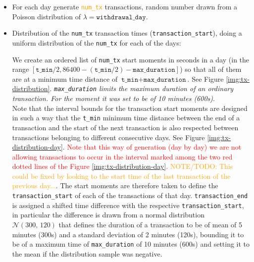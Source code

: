 \documentclass{article}
\begin{document}
\begin{itemize}
    \item For each day generate \textcolor{orange}{\texttt{num\_tx}} transactions, random 
    number drawn from a Poisson distribution of $\lambda = \texttt{withdrawal\_day}$.

    \item Distribution of the \texttt{num\_tx} transaction times 
    (\texttt{transaction\_start}), doing a uniform distribution of the \texttt{num\_tx}
    for each of the days: 
    
    We create an ordered list of  \texttt{num\_tx} start moments in seconds in a day 
    (in the range $[\texttt{t\_min}/2, 86400-(\texttt{t\_min}/2)-\texttt{max\_duration}]$) so that all of them are at a minimum time distance of $\texttt{t\_min} + \texttt{max\_duration}$. See Figure \ref{img:tx-distribution}.
    \textit{\texttt{max\_duration} limits the maximum duration of an ordinary transaction. 
    For the moment it was set to be of 10 minutes (600s)}.\\
    Note that the interval bounds for the transaction start moments are designed in such 
    a way that the \texttt{t\_min} minimum time distance between the end of a transaction 
    and the start of the next transaction is also respected between transactions belonging 
    to different consecutive days. See Figure \ref{img:tx-distribution-day}. 
    \textcolor{red}{Note that this way of generation (day by day) we are not allowing 
    transactions to occur in the interval marked among the two red dotted lines of the 
    Figure \ref{img:tx-distribution-day}.} \textcolor{orange}{NOTE/TODO: This could be 
    fixed by looking to the start time of the last transaction of the previous day...}. 
    The start moments are therefore taken to define the \texttt{transaction\_start} of 
    each of the transactions of that day. \texttt{transaction\_end} is assigned a shifted 
    time difference with the respective \texttt{transaction\_start}, in particular the 
    difference is drawn from a normal distribution $\mathcal{N}(300,\,120)$ that defines 
    the duration of a transaction to be of mean of 5 minutes (300s) and a standard 
    deviation of 2 minutes (120s), bounding it to be of a maximum time of 
    \texttt{max\_duration} of 10 minutes (600s) and setting it to the mean if the 
    distribution sample was negative. 


\end{itemize}
\end{document}
